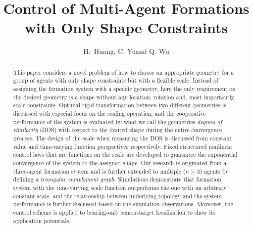 \documentclass[times]{rncauth}
\begin{document}

\title{Control of Multi-Agent Formations with Only Shape Constraints
\footnotemark[2]}

\author{H.~Huang\footnotemark[3], C. Yu\corrauth and Q. Wu\footnotemark[3]}


\begin{abstract}This paper considers a novel problem of how to
choose an appropriate geometry for a group of agents with only shape
constraints but with a flexible scale. Instead of assigning the
formation system with a specific geometry, here the only requirement
on the desired geometry is a shape without any location, rotation
and, most importantly, scale constraints. Optimal rigid
transformation between two different geometries is discussed with
especial focus on the scaling operation, and the cooperative
performance of the system is evaluated by what we call the geometries
 \emph{degrees of similarity} (DOS) with respect to the desired shape during the entire convergence process. The design  of the
scale when measuring the DOS is discussed from constant value and time-varying function
perspectives respectively. Fixed structured nonlinear  control laws
that are functions on the scale are developed to guarantee the
exponential convergence of the system to the assigned shape. Our
research is originated from a three-agent formation system and is
further extended to multiple ($n>3$) agents by defining a
\emph{triangular complement graph}. Simulations demonstrate that
formation system with the time-varying scale function outperforms
the one with an arbitrary constant scale, and the relationship
between underlying topology and the system performance is further
discussed based on the simulation observations. Moveover, the
control scheme is applied to bearing-only sensor-target localization
to show its application potentials.
\end{abstract}


\maketitle
\end{document}
